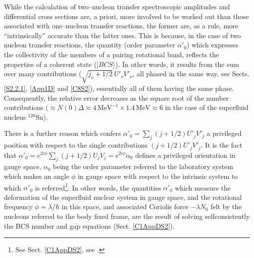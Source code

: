 While the calculation of two--nucleon transfer spectroscopic amplitudes and differential cross sections are, a priori, more involved to be worked out than those associated with one--nucleon transfer reactions, the former are, as a rule, more ``intrinsically'' accurate than the latter ones. This is because, in the case of two nucleon transfer reactions, the quantity (order parameter $\alpha'_0$) which expresses the collectivity of the members of a pairing rotational band, reflects the properties of a coherent state ($|BCS\rangle$). In other words, it results from the sum over many contributions ($\sqrt{j_{\nu}+1/2}\,U'_\nu V'_\nu$, all phased in the same way,  see Sects. \ref{S2.2.1}, \ref{App1D} and \ref{C8S2}), essentially all of them having the same phase. Consequently, the relative error decreases as the square root of the number contributions $(\approx N(0)\Delta\approx 4\,\text{MeV}^{-1}\times 1.4\,\text{MeV}\approx 6$ in the case of the superfluid nucleus $^{120}$Sn). 

There is a further reason which confers $\alpha'_0=\sum_j(j+1/2)U'_jV'_j$ a privileged position with respect to the single contributions $(j+1/2)U'_jV'_j$. It is the fact that $\alpha'_0=e^{2i\phi}\sum_j(j+1/2)U_jV_j=e^{2i\phi}\alpha_0$ defines a privileged orientation in gauge space, $\alpha_0$ being the order parameter referred to the laboratory system which makes an angle $\phi$ in gauge space with respect to the intrinsic system to which $\alpha'_0$ is referred\footnote{See Sect. \ref{C1AppDS2}, see \cite{Potel:13b}.}. In other words, the quantities $\alpha'_0$ which measure the deformation of the superfluid nuclear system in gauge space, and the rotational frequency $\dot\phi=\lambda/\hbar$ in this space, and associated Coriolis force $-\lambda N_0$ felt by the nucleons referred to the body fixed frame, are the result of solving selfconsistently the BCS number  and gap equations (Sect. \ref{C1AppDS2}).

